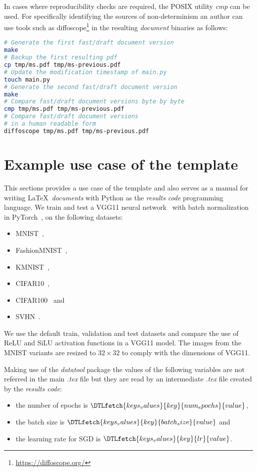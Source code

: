 \documentclass[journal]{IEEEtran}
\begin{document}
In cases where reproducibility checks are required, the POSIX utility \textit{cmp} can be used.
For specifically identifying the sources of non-determinism an author can use tools such as diffoscope\footnote{\url{https://diffoscope.org/}} in the resulting \textit{document} binaries as follows:
\begin{lstlisting}[language=bash, style=lststyle, caption={Test fast/draft document reproducibility.}]
# Generate the first fast/draft document version
make
# Backup the first resulting pdf
cp tmp/ms.pdf tmp/ms-previous.pdf
# Update the modification timestamp of main.py
touch main.py
# Generate the second fast/draft document version
make
# Compare fast/draft document versions byte by byte
cmp tmp/ms.pdf tmp/ms-previous.pdf
# Compare fast/draft document versions
# in a human readable form
diffoscope tmp/ms.pdf tmp/ms-previous.pdf
\end{lstlisting}

\section{Example use case of the template}
This sections provides a use case of the template and also serves as a manual for writing \LaTeX\ \textit{documents} with Python as the \textit{results code} programming language.
We train and test a VGG11 neural network~\cite{simonyan2014very} with batch normalization in PyTorch~\cite{paszke2019pytorch}, on the following datasets:
\begin{itemize}
	\item MNIST~\cite{lecun2010mnist},
	\item FashionMNIST~\cite{xiao2017fashion},
	\item KMNIST~\cite{clanuwat2018deep},
	\item CIFAR10~\cite{krizhevsky2009learning},
	\item CIFAR100~\cite{krizhevsky2009learning} and
	\item SVHN~\cite{netzer2011reading}.
\end{itemize}

We use the default train, validation and test datasets and compare the use of ReLU\cite{dahl2013improving} and SiLU\cite{elfwing2018sigmoid} activation functions in a VGG11 model.
The images from the MNIST variants are resized to $32\times 32$ to comply with the dimensions of VGG11.

Making use of the \textit{datatool} package the values of the following variables are not referred in the main \textit{.tex} file but they are read by an intermediate \textit{.tex} file created by the \textit{results code}:
\begin{itemize}
	\item the number of epochs is $\DTLfetch{keys_values}{key}{num_epochs}{value}$,
	\item the batch size is $\DTLfetch{keys_values}{key}{batch_size}{value}$ and
	\item the learning rate for SGD is $\DTLfetch{keys_values}{key}{lr}{value}$.
\end{itemize}
\end{document}
